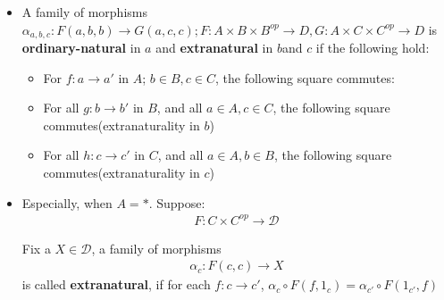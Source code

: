 \documentclass[Total.tex]{subfiles}
\begin{document}
				\begin{Def}
					\begin{itemize}
						\item A family of morphisms $\alpha_{a,b,c}: F(a,b,b)\rightarrow G(a,c,c);F:A\times B\times B^{op}\rightarrow D,G:A\times C\times C^{op}\rightarrow D$ is \textbf{ordinary-natural} in $a$ and \textbf{extranatural} in $b$and $c$ if the following hold:
						\begin{itemize}
							\item For $f:a\rightarrow a'$ in $A$; $b\in B,c\in C$, the following square commutes:
							\begin{center}
							\end{center}
							\item For all $g:b\rightarrow b'$ in $B$, and all $a\in A,c\in C$, the following square commutes(extranaturality in $b$)
							\begin{center}
							\end{center}
							\item For all $h:c\rightarrow c'$ in $C$, and all $a\in A,b\in B$, the following square commutes(extranaturality in $c$)
							\begin{center}
							\end{center}
						\end{itemize}
						\item Especially, when $A=*$. 	Suppose:
						\begin{gather*}
							F:C\times C^{op}\rightarrow \mathcal{D}
						\end{gather*}
						
						Fix a $X\in \mathcal{D}$, a family of morphisms
						\begin{gather*}
							\alpha_c:F(c,c)\rightarrow X
						\end{gather*}
						is called \textbf{extranatural}, if for each $f:c\rightarrow c'$, $\alpha_c\circ F(f,1_c)=\alpha_{c'}\circ F(1_{c'},f)$
						

\end{itemize}
\end{Def}
\end{document}
